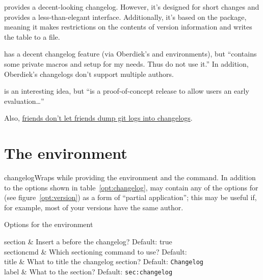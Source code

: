 \documentclass{ltxdoc}
\begin{document}
\begin{ctandescription}
	 provides a decent-looking changelog. However, it's
		designed for short changes and provides a less-than-elegant
		interface. Additionally, it's based on the 
		package, meaning it makes restrictions on the contents of
		version information and writes the table to a file.

	 has a decent changelog feature (via
		Oberdiek's  and  environments),
		but  ``contains some private macros and setup
		for my needs. Thus do not use it.'' In addition, Oberdiek's
		changelogs don't support multiple authors.

	 is an interesting idea, but  ``is a
		proof-of-concept release to allow users an early
		evaluation\dots''

		Also,
		\href{https://keepachangelog.com/en/1.0.0/}{friends don't
		let friends dump git logs into changelogs}.
\end{ctandescription}

\section{The  environment}

\begin{macro}{changelog}\AfterLastParam Wraps
 while providing the  environment and the
 command. In addition to the options shown in
table~\ref{opt:changelog},  may contain any of the options for
 (see figure~\ref{opt:version}) as a form of ``partial
application''; this may be useful if, for example, most of your versions
have the same author.

\begin{table}[h]
	\centering
	\caption{Options for the  environment}
	\label{opt:changelog}
	\begin{adjustwidth}{1in}{1in}
	\begin{Optionlist}
		section & Insert a  before the changelog?
			Default: true \\
		sectioncmd & Which sectioning command to use? Default:
			 \\
		title & What to title the changelog section? Default:
			\texttt{Changelog} \\
		label & What to  the section? Default:
			\texttt{sec:changelog} \\
	\end{Optionlist}
	\end{adjustwidth}
\end{table}
\end{macro}
\end{document}
